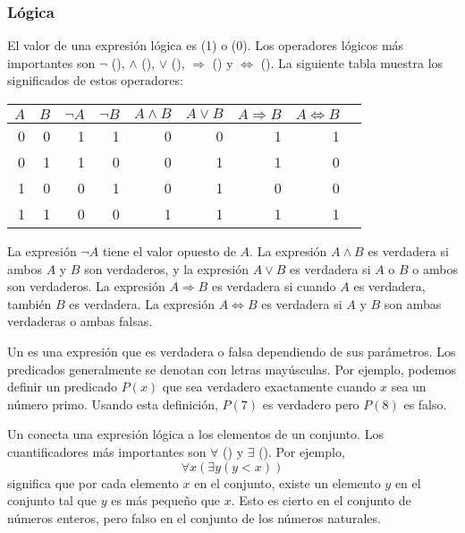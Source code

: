\subsubsection{Lógica}


El valor de una expresión lógica es
 (1) o  (0).
Los operadores lógicos más importantes son
$\lnot$ (),
$\land$ (),
$\lor$ (),
$\Rightarrow$ () y
$\Leftrightarrow$ ().
La siguiente tabla muestra los significados de estos operadores:

\begin{center}
\begin{tabular}{rr|rrrrrrr}
$A$ & $B$ & $\lnot A$ & $\lnot B$ & $A \land B$ & $A \lor B$ & $A \Rightarrow B$ & $A \Leftrightarrow B$ \\
\hline
0 & 0 & 1 & 1 & 0 & 0 & 1 & 1 \\
0 & 1 & 1 & 0 & 0 & 1 & 1 & 0 \\
1 & 0 & 0 & 1 & 0 & 1 & 0 & 0 \\
1 & 1 & 0 & 0 & 1 & 1 & 1 & 1 \\
\end{tabular}
\end{center}

La expresión $\lnot A$ tiene el valor opuesto de $A$.
La expresión $A \land B$ es verdadera si ambos $A$ y $B$
son verdaderos,
y la expresión $A \lor B$ es verdadera si $A$ o $B$ o ambos
son verdaderos.
La expresión $A \Rightarrow B$ es verdadera
si cuando $A$ es verdadera, también $B$ es verdadera.
La expresión $A \Leftrightarrow B$ es verdadera
si $A$ y $B$ son ambas verdaderas o ambas falsas.


Un  es una expresión que es verdadera o falsa
dependiendo de sus parámetros.
Los predicados generalmente se denotan con letras mayúsculas.
Por ejemplo, podemos definir un predicado $P(x)$
que sea verdadero exactamente cuando $x$ sea un número primo.
Usando esta definición, $P(7)$ es verdadero pero $P(8)$ es falso.


Un  conecta una expresión lógica
a los elementos de un conjunto.
Los cuantificadores más importantes son
$\forall$ () y $\exists$ ().
Por ejemplo,
\[\forall x (\exists y (y < x))\]
significa que por cada elemento $x$ en el conjunto,
existe un elemento $y$ en el conjunto
tal que $y$ es más pequeño que $x$.
Esto es cierto en el conjunto de números enteros,
pero falso en el conjunto de los números naturales.

